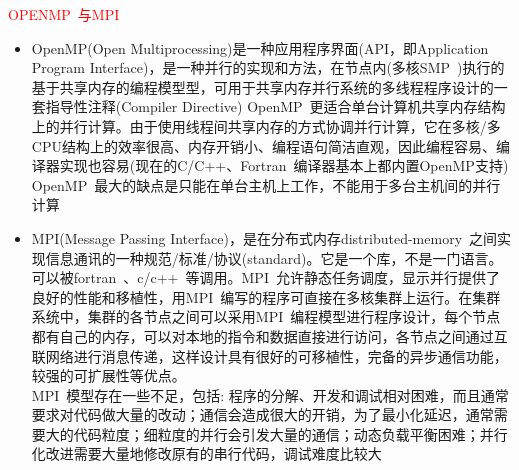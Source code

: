 \documentclass{article}      %
\begin{document}
\textcolor{red}{\textrm{OPENMP~}与\textrm{MPI~}}
\begin{itemize}
	\item \textrm{OpenMP(Open Multiprocessing)}是一种应用程序界面(\textrm{API}，即\textrm{Application Program Interface})，是一种并行的实现和方法，在节点内(多核\textrm{SMP~})执行的基于共享内存的编程模型型，可用于共享内存并行系统的多线程程序设计的一套指导性注释(\textrm{Compiler Directive}) \textrm{OpenMP~}更适合单台计算机共享内存结构上的并行计算。由于使用线程间共享内存的方式协调并行计算，它在多核/多CPU结构上的效率很高、内存开销小、编程语句简洁直观，因此编程容易、编译器实现也容易(现在的\textrm{C/C++}、\textrm{Fortran~}编译器基本上都内置\textrm{OpenMP}支持)\\
\textrm{OpenMP~}最大的缺点是只能在单台主机上工作，不能用于多台主机间的并行计算\\
	\item \textrm{MPI(Message Passing Interface)}，是在分布式内存\textrm{distributed-memory~}之间实现信息通讯的一种规范/标准/协议(\textrm{standard})。它是一个库，不是一门语言。可以被\textrm{fortran~}、\textrm{c/c++~}等调用。\textrm{MPI~}允许静态任务调度，显示并行提供了良好的性能和移植性，用\textrm{MPI~}编写的程序可直接在多核集群上运行。在集群系统中，集群的各节点之间可以采用\textrm{MPI~}编程模型进行程序设计，每个节点都有自己的内存，可以对本地的指令和数据直接进行访问，各节点之间通过互联网络进行消息传递，这样设计具有很好的可移植性，完备的异步通信功能，较强的可扩展性等优点。\\
\textrm{MPI~}模型存在一些不足，包括: 程序的分解、开发和调试相对困难，而且通常要求对代码做大量的改动；通信会造成很大的开销，为了最小化延迟，通常需要大的代码粒度；细粒度的并行会引发大量的通信；动态负载平衡困难；并行化改进需要大量地修改原有的串行代码，调试难度比较大
\end{itemize}
\end{document}
